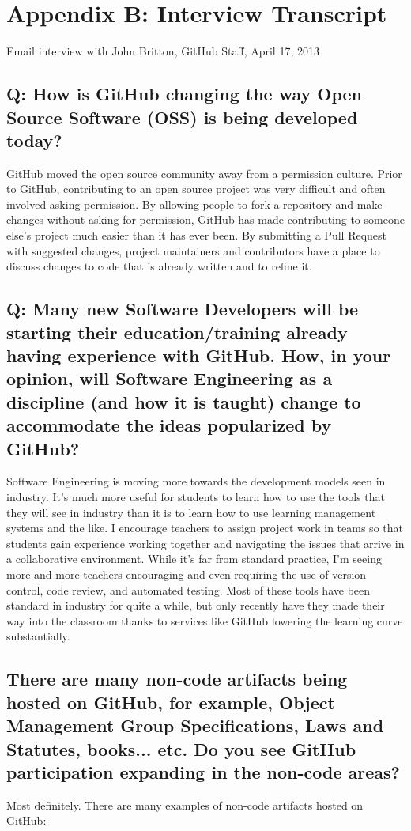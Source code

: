 \clearpage

\section*{Appendix B: Interview Transcript}
Email interview with John Britton, GitHub Staff, April 17, 2013

\subsection*{Q: How is GitHub changing the way Open Source Software (OSS) is being developed today?}
GitHub moved the open source community away from a permission culture. Prior to GitHub, contributing to an open source project was very difficult and often involved asking permission. By allowing people to fork a repository and make changes without asking for permission, GitHub has made contributing to someone else's project much easier than it has ever been. By submitting a Pull Request with suggested changes, project maintainers and contributors have a place to discuss changes to code that is already written and to refine it.

\subsection*{Q: Many new Software Developers will be starting their education/training already having experience with GitHub. How, in your opinion, will Software Engineering as a discipline (and how it is taught) change to accommodate the ideas popularized by GitHub?}

Software Engineering is moving more towards the development models seen in industry. It's much more useful for students to learn how to use the tools that they will see in industry than it is to learn how to use learning management systems and the like. I encourage teachers to assign project work in teams so that students gain experience working together and navigating the issues that arrive in a collaborative environment. While it's far from standard practice, I'm seeing more and more teachers encouraging and even requiring the use of version control, code review, and automated testing. Most of these tools have been standard in industry for quite a while, but only recently have they made their way into the classroom thanks to services like GitHub lowering the learning curve substantially.

\subsection*{There are many non-code artifacts being hosted on GitHub, for example, Object Management Group Specifications, Laws and Statutes, books... etc. Do you see GitHub participation expanding in the non-code areas?}
Most definitely. There are many examples of non-code artifacts hosted on GitHub:

